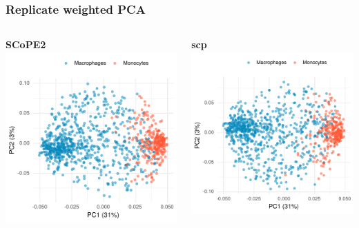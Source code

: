 \documentclass{beamer}
\newcommand{\frametitlesection}[1]{\frametitle{\centering #1 \footnotesize \hspace{0pt plus 1 filll} \insertsection}}
\begin{document}
\begin{frame}
    \frametitlesection{Replicate weighted PCA}
    
    \begin{columns}
        \begin{column}{0.5\textwidth}
            \textbf{SCoPE2}
            \includegraphics[width=\textwidth]{figs/wPCA_SCoPE2.pdf}
        \end{column}
        \begin{column}{0.5\textwidth}
            \textbf{scp}
            \includegraphics[width=\textwidth]{figs/wPCA_scp.pdf}
        \end{column}
    \end{columns}
\end{frame}
\end{document}
